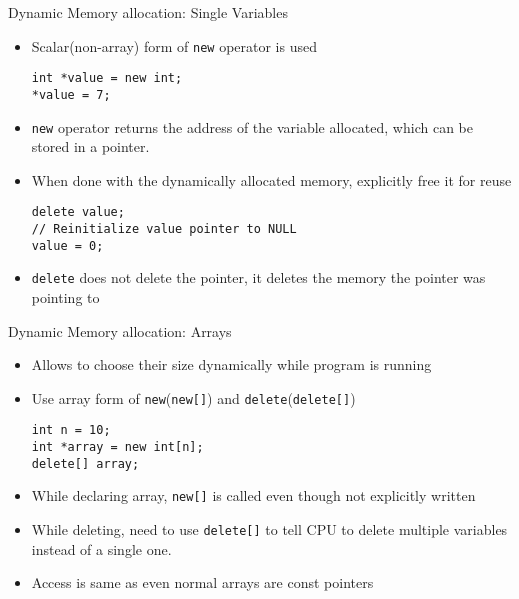 \documentclass{beamer}
\begin{document}
\begin{frame}[fragile]{Dynamic Memory allocation: Single Variables}
  \begin{itemize}
    \item Scalar(non-array) form of \texttt{new} operator is used\pause
      \begin{lstlisting}
int *value = new int;
*value = 7;
      \end{lstlisting}\pause
    \item \texttt{new} operator returns the address of the variable allocated, which can be stored in a pointer.\pause
    \item When done with the dynamically allocated memory, explicitly free it for reuse\pause
      \begin{lstlisting}
delete value;
// Reinitialize value pointer to NULL
value = 0;
      \end{lstlisting}\pause
    \item \texttt{delete} does not delete the pointer, it deletes the memory the pointer was pointing to
  \end{itemize}
\end{frame}

\begin{frame}[fragile]{Dynamic Memory allocation: Arrays}
  \begin{itemize}
    \item Allows to choose their size dynamically while program is running\pause
    \item Use array form of \texttt{new}(\texttt{new[]}) and \texttt{delete}(\texttt{delete[]})\pause
      \begin{lstlisting}
int n = 10;
int *array = new int[n];
delete[] array;
      \end{lstlisting}\pause
    \item While declaring array, \texttt{new[]} is called even though not explicitly written\pause
    \item While deleting, need to use \texttt{delete[]} to tell CPU to delete multiple variables instead of a single one.\pause
    \item Access is same as even normal arrays are const pointers
  \end{itemize}
\end{frame}

\end{document}
